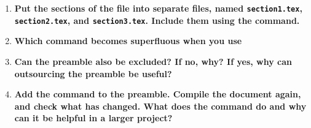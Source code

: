 \begin{enumerate}
  \item \textbf{Put the sections of the file into separate files, named 
  \texttt{section1.tex}, \texttt{section2.tex}, and \texttt{section3.tex}. 
  Include them using the   command.}
  \item \textbf{Which command becomes superfluous when you use 
  }
  \item \textbf{Can the preamble also be excluded? If no, why? If yes, why can 
  outsourcing the preamble be useful?}
  \item \textbf{Add the command  to 
  the 
  preamble. Compile the document again, and check what has changed. What does 
  the command do and why can it be helpful in a larger project? }
\end{enumerate}
